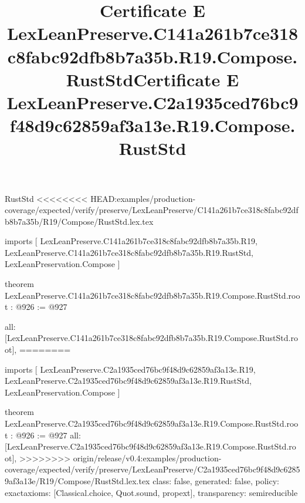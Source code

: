 \begin{lexlean}{RustStd}
<<<<<<<< HEAD:examples/production-coverage/expected/verify/preserve/LexLeanPreserve/C141a261b7ce318c8fabc92dfb8b7a35b/R19/Compose/RustStd.lex.tex
\title{Certificate E LexLeanPreserve.C141a261b7ce318c8fabc92dfb8b7a35b.R19.Compose.RustStd}
\begin{coremodule}
imports [
  LexLeanPreserve.C141a261b7ce318c8fabc92dfb8b7a35b.R19,
  LexLeanPreserve.C141a261b7ce318c8fabc92dfb8b7a35b.R19.RustStd,
  LexLeanPreservation.Compose
]

theorem LexLeanPreserve.C141a261b7ce318c8fabc92dfb8b7a35b.R19.Compose.RustStd.root : @926 := @927 {
  all: [LexLeanPreserve.C141a261b7ce318c8fabc92dfb8b7a35b.R19.Compose.RustStd.root],
========
\title{Certificate E LexLeanPreserve.C2a1935ced76bc9f48d9c62859af3a13e.R19.Compose.RustStd}
\begin{coremodule}
imports [
  LexLeanPreserve.C2a1935ced76bc9f48d9c62859af3a13e.R19,
  LexLeanPreserve.C2a1935ced76bc9f48d9c62859af3a13e.R19.RustStd,
  LexLeanPreservation.Compose
]

theorem LexLeanPreserve.C2a1935ced76bc9f48d9c62859af3a13e.R19.Compose.RustStd.root : @926 := @927 {
  all: [LexLeanPreserve.C2a1935ced76bc9f48d9c62859af3a13e.R19.Compose.RustStd.root],
>>>>>>>> origin/release/v0.4:examples/production-coverage/expected/verify/preserve/LexLeanPreserve/C2a1935ced76bc9f48d9c62859af3a13e/R19/Compose/RustStd.lex.tex
  class: false,
  generated: false,
  policy: exact{axioms: [Classical.choice, Quot.sound, propext]},
  transparency: semireducible
}


\end{coremodule}}
\end{coremodule}
\end{lexlean}
